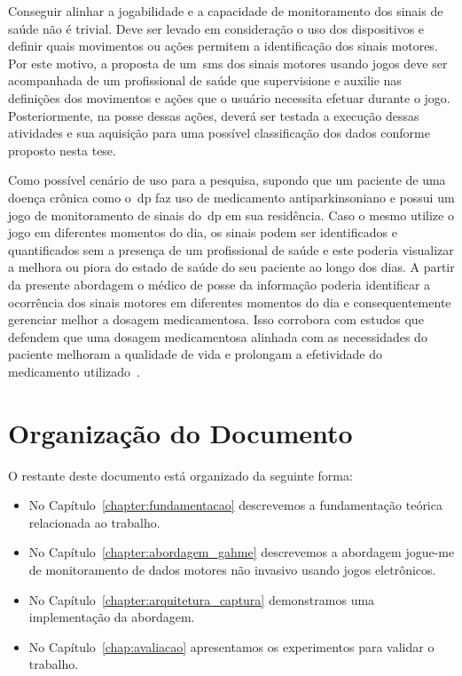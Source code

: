 Conseguir alinhar a jogabilidade e a capacidade de monitoramento dos sinais de saúde não é trivial. Deve ser levado em consideração o uso dos dispositivos e definir quais movimentos ou ações permitem a identificação dos sinais motores. Por este motivo, a proposta de um~\ac{sms} dos sinais motores usando jogos deve ser acompanhada de um profissional de saúde que supervisione e auxilie nas definições dos movimentos e ações que o usuário necessita efetuar durante o jogo. Posteriormente, na posse dessas ações, deverá ser testada a execução dessas atividades e sua aquisição para uma possível classificação dos dados conforme proposto nesta tese.

Como possível cenário de uso para a pesquisa, supondo que um paciente de uma doença crônica como o~\ac{dp} faz uso de medicamento antiparkinsoniano e possui um jogo de monitoramento de sinais do~\ac{dp} em sua residência. Caso o mesmo utilize o jogo em diferentes momentos do dia, os sinais podem ser identificados e quantificados sem a presença de um profissional de saúde e este poderia visualizar a melhora ou piora do estado de saúde do seu paciente ao longo dos dias. A partir da presente abordagem o médico de posse da informação poderia identificar a ocorrência dos sinais motores em diferentes momentos do dia e consequentemente gerenciar melhor a dosagem medicamentosa. Isso corrobora com estudos que defendem que uma dosagem medicamentosa alinhada com as necessidades do paciente melhoram a qualidade de vida e prolongam a efetividade do medicamento utilizado~\cite{rodrigues2006}.

\section{Organização do Documento}
O restante deste documento está organizado da seguinte forma:
\begin{itemize}
	\item No Capítulo~\ref{chapter:fundamentacao} descrevemos a fundamentação teórica relacionada ao trabalho.
	\item No Capítulo~\ref{chapter:abordagem_gahme} descrevemos a abordagem \ac{jogue-me} de monitoramento de dados motores não invasivo usando jogos eletrônicos.
	\item No Capítulo~\ref{chapter:arquitetura_captura} demonstramos uma implementação da abordagem.
	\item No Capítulo~\ref{chap:avaliacao} apresentamos os experimentos para validar o trabalho.
\end{itemize}

